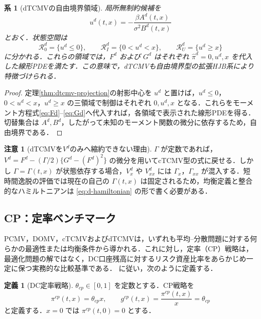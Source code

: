\documentclass[10pt,a4paper]{article}
\theoremstyle{plain}
\newtheorem{corollary}{系}
\theoremstyle{definition}
\newtheorem{definition}{定義}
\newtheorem{remark}{注意}
\begin{document}
\begin{corollary}[dTCMVの自由境界領域]
局所無制約候補を
\[
  u^d(t,x)=-\frac{\beta A^d(t,x)}{\sigma^2B^d(t,x)}
\]
とおく．状態空間は
\[
  \mathcal R_0^d=\{u^d\leq0\},\qquad
  \mathcal R_I^d=\{0<u^d<x\},\qquad
  \mathcal R_U^d=\{u^d\geq x\}
\]
に分かれる．これらの領域では，$F^d$ および $G^d$ はそれぞれ $\hat\pi^d=0,u^d,x$ を代入した線形PDEを満たす．この意味で，dTCMVも自由境界型の拡張HJB系により特徴づけられる．
\end{corollary}

\begin{proof}
定理\ref{thm:dtcmv-projection}の射影中心を $u^d$ と置けば，$u^d\leq0$，$0<u^d<x$，$u^d\geq x$ の三領域で制御はそれぞれ $0,u^d,x$ となる．これらをモーメント方程式\eqref{eq:Fd}--\eqref{eq:Gd}へ代入すれば，各領域で表示された線形PDEを得る．切替集合は $A^d,B^d$，したがって未知のモーメント関数の微分に依存するため，自由境界である．
\end{proof}

\begin{remark}[dTCMVを$V^d$のみへ縮約できない理由]
$\Gamma$ が定数であれば，$V^d=F^d-(\Gamma/2)\{G^d-(F^d)^2\}$ の微分を用いてcTCMV型の式に戻せる．しかし $\Gamma=\Gamma(t,x)$ が状態依存する場合，$V_x^d$ や $V_{xx}^d$ には $\Gamma_x$，$\Gamma_{xx}$ が混入する．短時間逸脱の評価では現在の自己の $\Gamma(t,x)$ は固定されるため，均衡定義と整合的なハミルトニアンは \eqref{eq:d-hamiltonian} の形で書く必要がある．
\end{remark}


\subsection{CP：定率ベンチマーク}
\label{sec:cp-benchmark}

PCMV，DOMV，cTCMVおよびdTCMVは，いずれも平均--分散問題に対する何らかの最適性または均衡条件から導かれる．これに対し，定率（CP）戦略は，最適化問題の解ではなく，DC口座残高に対するリスク資産比率をあらかじめ一定に保つ実務的な比較基準である．\citet{vanStadenDangForsyth2021} に従い，次のように定義する．

\begin{definition}[DC定率戦略]
\label{def:cp}
$\theta_{cp}\in[0,1]$ を定数とする．CP戦略を
\begin{equation}
  \pi^{cp}(t,x)=\theta_{cp}x,
  \qquad
  g^{cp}(t,x)=\frac{\pi^{cp}(t,x)}{x}=\theta_{cp}
  \label{eq:cp-policy}
\end{equation}
と定義する．$x=0$ では $\pi^{cp}(t,0)=0$ とする．
\end{definition}
\end{document}
